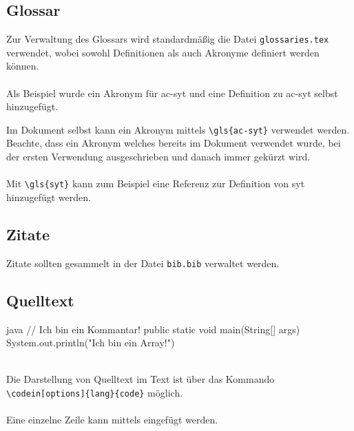 \subsection{Glossar}
Zur Verwaltung des Glossars wird standardmäßig die Datei \texttt{glossaries.tex} verwendet, wobei sowohl Definitionen als auch Akronyme definiert werden können.
\\\\
Als Beispiel wurde ein Akronym für \gls{ac-syt} und eine Definition zu \gls{ac-syt} selbst hinzugefügt.


Im Dokument selbst kann ein Akronym mittels \verb|\gls{ac-syt}| verwendet werden. Beachte, dass ein Akronym welches bereits im Dokument verwendet wurde, bei der ersten Verwendung ausgeschrieben und danach immer gekürzt wird.
\\\\
Mit \verb|\gls{syt}| kann zum Beispiel eine Referenz zur Definition von \gls{syt} hinzugefügt werden.

\subsection{Zitate}
Zitate sollten gesammelt in der Datei \texttt{bib.bib} verwaltet werden.

\newpage
\subsection{Quelltext}
\begin{listing}
\ifminted   {}
\else       {}\fi
\begin{code}[firstnumber=last]{java}
// Ich bin ein Kommantar!
public static void main(String[] args) {
    System.out.println("Ich bin ein Array!")
}
\end{code}
\ifminted   {}
\else       {}\fi

\caption{Java Code}
\label{lst:java-code}
\end{listing}
~\\
Die Darstellung von Quelltext im Text ist über das Kommando \verb|\codein[options]{lang}{code}| möglich.
\\\\
Eine einzelne Zeile kann mittels
\ifminted   {}
\else       {}\fi
eingefügt werden.

